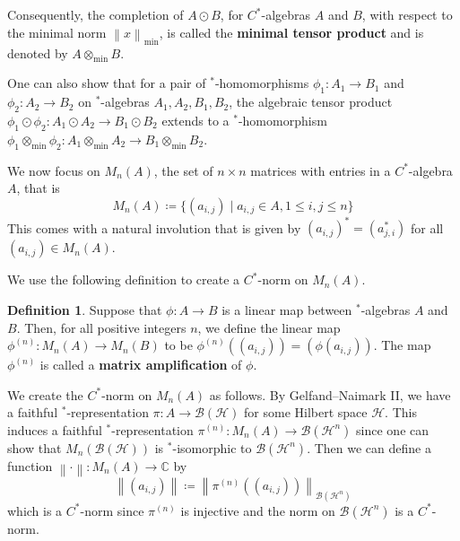 \documentclass{article}
\theoremstyle{plain}
\theoremstyle{definition}
\newtheorem{definition}[theorem]{Definition}
\theoremstyle{remark}
\newcommand{\norm}[1]{\left\lVert#1\right\rVert}
\begin{document}
Consequently, the completion of $A \odot B$, for $C^*$-algebras $A$ and $B$,
with respect to the minimal norm $\norm{x}_{\min}$, 
is called the \textbf{minimal tensor product}
and is denoted by $A \otimes_{\min} B$.

One can also show 
\citep[Corollary 11.29]{courtney2023notes}
that 
for a pair of $^*$-homomorphisms 
$\phi_1 : A_1 \rightarrow B_1$
and
$\phi_2 : A_2 \rightarrow B_2$
on $^*$-algebras $A_1, A_2, B_1, B_2$,
the algebraic tensor product
$\phi_1 \odot \phi_2 : A_1 \odot A_2 \rightarrow B_1 \odot B_2$
extends to a $^*$-homomorphism
$\phi_1 \otimes_{\min} \phi_2 : A_1 \otimes_{\min} A_2 \rightarrow B_1 \otimes_{\min} B_2$.

We now focus on $M_n(A)$, the set of $n \times n$ matrices with entries in 
a $C^*$-algebra $A$, that is
\begin{equation}
	M_n(A)
	\coloneqq
	\{(a_{i,j}) \mid a_{i,j} \in A, 1 \leq i,j \leq n\}
\end{equation}
This comes with a natural involution that is given by
$(a_{i,j})^* = (a_{j,i}^*)$ for all $(a_{i,j}) \in M_n(A)$.

We use the following definition to create a $C^*$-norm on $M_n(A)$.

\begin{definition} 
	Suppose that $\phi: A \rightarrow B$ is a linear map
	between $^*$-algebras $A$ and $B$.
	Then, for all positive integers $n$, we define the linear map
	$\phi^{(n)} : M_n(A) \rightarrow M_n(B)$ to be
	$\phi^{(n)}((a_{i,j})) = (\phi(a_{i,j}))$.
	The map $\phi^{(n)}$ is called a \textbf{matrix amplification} of $\phi$.
\end{definition}

We create the $C^*$-norm on $M_n(A)$ as follows.
By Gelfand--Naimark II,
we have a faithful $^*$-representation 
$\pi : A \rightarrow \mathcal{B}(\mathcal{H})$ 
for some Hilbert space $\mathcal{H}$.
This induces a faithful
$^*$-representation
$\pi^{(n)} : M_n(A) \rightarrow \mathcal{B}(\mathcal{H}^n)$
since one can show 
\citet[Section 6.1]{rordam2000}
that
$M_n(\mathcal{B}(\mathcal{H}))$ is $^*$-isomorphic to $\mathcal{B}(\mathcal{H}^n)$.
Then we can define a function $\norm{\cdot}: M_n(A) \rightarrow \mathbb{C}$ by
\begin{equation} \label{normMnA}
	\norm{(a_{i,j})} 
	\coloneqq
	\norm{\pi^{(n)}((a_{i,j}))}_{\mathcal{B}(\mathcal{H}^n)}
\end{equation}
which is a $C^*$-norm 
since $\pi^{(n)}$ is injective and
the norm on $\mathcal{B}(\mathcal{H}^n)$
is a $C^*$-norm. 
\end{document}
